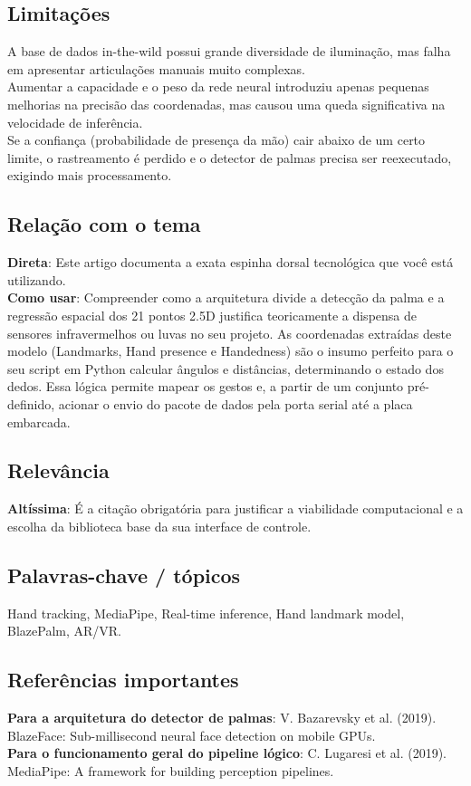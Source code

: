 \documentclass[12pt, a4paper]{article}
\begin{document}
\subsection{Limitações}
A base de dados in-the-wild possui grande diversidade de iluminação, mas falha em apresentar articulações manuais muito complexas.\\
Aumentar a capacidade e o peso da rede neural introduziu apenas pequenas melhorias na precisão das coordenadas, mas causou uma queda significativa na velocidade de inferência.\\
Se a confiança (probabilidade de presença da mão) cair abaixo de um certo limite, o rastreamento é perdido e o detector de palmas precisa ser reexecutado, exigindo mais processamento.\\
\subsection{Relação com o tema}
\textbf{Direta}: Este artigo documenta a exata espinha dorsal tecnológica que você está utilizando.\\
\textbf{Como usar}: Compreender como a arquitetura divide a detecção da palma e a regressão espacial dos 21 pontos 2.5D justifica teoricamente a dispensa de sensores infravermelhos ou luvas no seu projeto. As coordenadas extraídas deste modelo (Landmarks, Hand presence e Handedness) são o insumo perfeito para o seu script em Python calcular ângulos e distâncias, determinando o estado dos dedos. Essa lógica permite mapear os gestos e, a partir de um conjunto pré-definido, acionar o envio do pacote de dados pela porta serial até a placa embarcada.\\
\subsection{Relevância}
\textbf{Altíssima}: É a citação obrigatória para justificar a viabilidade computacional e a escolha da biblioteca base da sua interface de controle.\\
\subsection{Palavras-chave / tópicos}
Hand tracking, MediaPipe, Real-time inference, Hand landmark model, BlazePalm, AR/VR.\\
\subsection{Referências importantes}
\textbf{Para a arquitetura do detector de palmas}: V. Bazarevsky et al. (2019). BlazeFace: Sub-millisecond neural face detection on mobile GPUs.\\
\textbf{Para o funcionamento geral do pipeline lógico}: C. Lugaresi et al. (2019). MediaPipe: A framework for building perception pipelines.\\
\newpage
\end{document}
